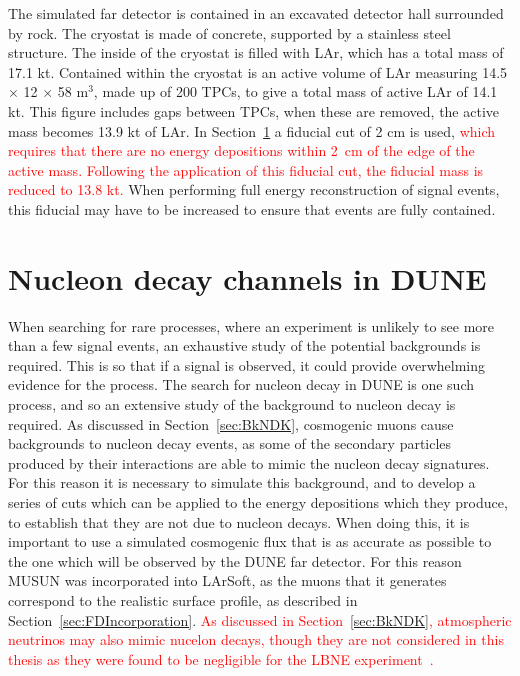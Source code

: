 The simulated far detector is contained in an excavated detector hall surrounded by rock. The cryostat is made of concrete, supported by a stainless steel structure. The inside of the cryostat is filled with LAr, which has a total mass of 17.1 kt. Contained within the cryostat is an active volume of LAr measuring 14.5 $\times$ 12 $\times$ 58 m$^{3}$, made up of 200 TPCs, to give a total mass of active LAr of 14.1 kt. This figure includes gaps between TPCs, when these are removed, the active mass becomes 13.9 kt of LAr. In Section~\ref{sec:DUNENDK} a fiducial cut of 2 cm is used, \textcolor{red}{which requires that there are no energy depositions within 2~cm of the edge of the active mass. Following the application of this fiducial cut, the fiducial mass is reduced to 13.8 kt.} When performing full energy reconstruction of signal events, this fiducial may have to be increased to ensure that events are fully contained. \\

\section{Nucleon decay channels in DUNE} \label{sec:DUNENDK} %
When searching for rare processes, where an experiment is unlikely to see more than a few signal events, an exhaustive study of the potential backgrounds is required. This is so that if a signal is observed, it could provide overwhelming evidence for the process. The search for nucleon decay in DUNE is one such process, and so an extensive study of the background to nucleon decay is required. As discussed in Section~\ref{sec:BkNDK}, cosmogenic muons cause backgrounds to nucleon decay events, as some of the secondary particles produced by their interactions are able to mimic the nucleon decay signatures. For this reason it is necessary to simulate this background, and to develop a series of cuts which can be applied to the energy depositions which they produce, to establish that they are not due to nucleon decays. When doing this, it is important to use a simulated cosmogenic flux that is as accurate as possible to the one which will be observed by the DUNE far detector. For this reason MUSUN was incorporated into LArSoft, as the muons that it generates correspond to the realistic surface profile, as described in Section~\ref{sec:FDIncorporation}. \textcolor{red}{As discussed in Section~\ref{sec:BkNDK}, atmospheric neutrinos may also mimic nucelon decays, though they are not considered in this thesis as they were found to be negligible for the LBNE experiment~\citep{LBNE8836}.} \\

